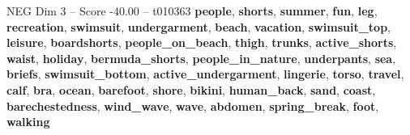 \begin{textsample}{NEG Dim 3 – Score -40.00 – t010363}  \label{ex:f3_neg_001}
\textbf{people}, \textbf{shorts}, \textbf{summer}, \textbf{fun}, \textbf{leg}, \textbf{recreation}, \textbf{swimsuit}, \textbf{undergarment}, \textbf{beach}, \textbf{vacation}, \textbf{swimsuit\_top}, \textbf{leisure}, \textbf{boardshorts}, \textbf{people\_on\_beach}, \textbf{thigh}, \textbf{trunks}, \textbf{active\_shorts}, \textbf{waist}, \textbf{holiday}, \textbf{bermuda\_shorts}, \textbf{people\_in\_nature}, \textbf{underpants}, \textbf{sea}, \textbf{briefs}, \textbf{swimsuit\_bottom}, \textbf{active\_undergarment}, \textbf{lingerie}, \textbf{torso}, \textbf{travel}, \textbf{calf}, \textbf{bra}, \textbf{ocean}, \textbf{barefoot}, \textbf{shore}, \textbf{bikini}, \textbf{human\_back}, \textbf{sand}, \textbf{coast}, \textbf{barechestedness}, \textbf{wind\_wave}, \textbf{wave}, \textbf{abdomen}, \textbf{spring\_break}, \textbf{foot}, \textbf{walking}

\end{textsample}

